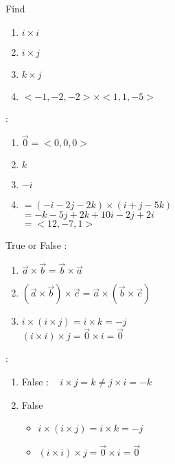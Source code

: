 \noindent{\color{smalt(darkpowderblue)}\rule{\linewidth}{.2mm}}
\begin{example}
Find 
\begin{enumerate}
\item $i \times i$
\item $i \times j $
\item $k \times j$
\item $<-1,-2,-2> \times <1,1,-5> $
\end{enumerate}
{} :
\begin{enumerate}
\item $ {\overrightarrow{0}} = <0,0,0>$
\item $ k$
\item $-i$
\item $= (-i -2j -2k) \times (i + j -5k)$\\
$ = -k -5j +2k +10i -2j +2i $\\
$= <12,-7,1>$
\end{enumerate}
\end{example}
\noindent{\color{smalt(darkpowderblue)}\rule{\linewidth}{.2mm}}
\begin{example}
True or False :
\begin{enumerate}
\item ${\overrightarrow{a}}\times{\overrightarrow{b}} = {\overrightarrow{b}}\times{\overrightarrow{a}}$
\item  $({\overrightarrow{a}}\times{\overrightarrow{b}}) \times {\overrightarrow{c}} = {\overrightarrow{a}}\times ({\overrightarrow{b}}\times \overrightarrow{c}) $
\item  $i\times(i \times j) = i \times k = -j$\\
$(i \times i) \times j = \overrightarrow{0} \times i = \overrightarrow{0}$
\end{enumerate}
{} :
\begin{enumerate}
\item False : ~ $ i \times j = k \neq j \times i = -k $
\item False \begin{itemize}
\item $ i\times(i \times j) = i \times k = -j$
\item $(i \times i) \times j = \overrightarrow{0} \times i = \overrightarrow{0}$
\end{itemize}
\end{enumerate}
\end{example}
